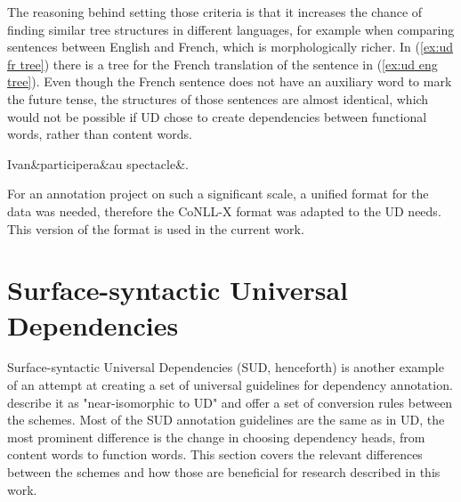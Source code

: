 The reasoning behind setting those criteria is that it increases the chance of finding similar tree structures in different languages, for example when comparing sentences between English and French, which is morphologically richer. In (\ref{ex:ud fr tree}) there is a tree for the French translation of the sentence in (\ref{ex:ud eng tree}). Even though the French sentence does not have an auxiliary word to mark the future tense, the structures of those sentences are almost identical, which would not be possible if UD chose to create dependencies between functional words, rather than content words.

\begin{exe}
    \ex
    \label{ex:ud fr tree}
    \begin{dependency}[theme = simple]
        \begin{deptext}
            Ivan\&participera\&au spectacle\&.\\
        \end{deptext}
    \end{dependency}
\end{exe}

For an annotation project on such a significant scale, a unified format for the data was needed, therefore the CoNLL-X format was adapted to the UD needs. This version of the format is used in the current work. 

\section{Surface-syntactic Universal Dependencies}\label{sec:sud}
Surface-syntactic Universal Dependencies (SUD, henceforth) is another example of an attempt at creating a set of universal guidelines for dependency annotation. \cite{gerdes-etal-2018-sud} describe it as "near-isomorphic to UD" and offer a set of conversion rules between the schemes. Most of the SUD annotation guidelines are the same as in UD, the most prominent difference is the change in choosing dependency heads, from content words to function words. This section covers the relevant differences between the schemes and how those are beneficial for research described in this work.

